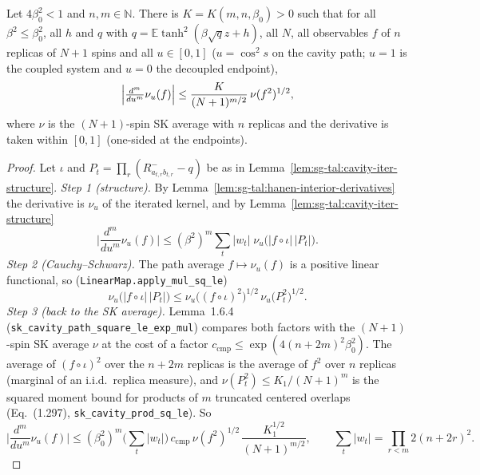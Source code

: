 \begin{lemma}\label{lem:sg-tal:cavity-iterated-deriv-bound}
\leanok
{}
Let $4\beta_0^2 < 1$ and $n, m \in \mathbb N$. There is $K=K(m,n,\beta_0)>0$ such that for all $\beta^2 \le \beta_0^2$, all $h$ and $q$ with $q = \mathbb E \tanh^2(\beta \sqrt{q} z + h)$, all $N$, all observables $f$ of $n$ replicas of $N+1$ spins and all $u \in [0, 1]$ ($u = \cos^2 s$ on the cavity path; $u=1$ is the coupled system and $u=0$ the decoupled endpoint),
\[
\Bigl|\tfrac{d^m}{du^m}\nu_u(f)\Bigr| \le \frac{K}{(N+1)^{m/2}} \, \nu(f^2)^{1/2},
\]
where $\nu$ is the $(N+1)$-spin SK average with $n$ replicas and the derivative is taken within $[0,1]$ (one-sided at the endpoints).
\end{lemma}
\begin{proof}
\leanok
Let $\iota$ and $P_t=\prod_r(R^-_{a_{t,r}b_{t,r}}-q)$ be as in Lemma~\ref{lem:sg-tal:cavity-iter-structure}.
\emph{Step 1 (structure).} By Lemma~\ref{lem:sg-tal:hanen-interior-derivatives} the derivative is $\nu_u$ of the iterated kernel, and by Lemma~\ref{lem:sg-tal:cavity-iter-structure}
\[
\Big|\frac{d^m}{du^m}\nu_u(f)\Big|\le(\beta^2)^m\sum_t|w_t|\;\nu_u\big(|f\circ\iota|\,|P_t|\big).
\]
\emph{Step 2 (Cauchy--Schwarz).} The path average $f\mapsto\nu_u(f)$ is a positive linear functional, so (\texttt{LinearMap.apply\_mul\_sq\_le})
\[
\nu_u\big(|f\circ\iota|\,|P_t|\big)\le\nu_u\big((f\circ\iota)^2\big)^{1/2}\,\nu_u\big(P_t^2\big)^{1/2}.
\]
\emph{Step 3 (back to the SK average).} Lemma~1.6.4 (\texttt{sk\_cavity\_path\_square\_le\_exp\_mul}) compares both factors with the $(N+1)$-spin SK average $\nu$ at the cost of a factor $c_{\mathrm{cmp}}\le\exp(4(n+2m)^2\beta_0^2)$. The average of $(f\circ\iota)^2$ over the $n+2m$ replicas is the average of $f^2$ over $n$ replicas (marginal of an i.i.d.\ replica measure), and $\nu(P_t^2)\le K_1/(N+1)^m$ is the squared moment bound for products of $m$ truncated centered overlaps (Eq.~(1.297), \texttt{sk\_cavity\_prod\_sq\_le}). So
\[
\Big|\frac{d^m}{du^m}\nu_u(f)\Big|\le(\beta_0^2)^m\Big(\sum_t|w_t|\Big)\,c_{\mathrm{cmp}}\,\nu(f^2)^{1/2}\,\frac{K_1^{1/2}}{(N+1)^{m/2}},\qquad\sum_t|w_t|=\prod_{r<m}2(n+2r)^2 .
\]
\end{proof}

